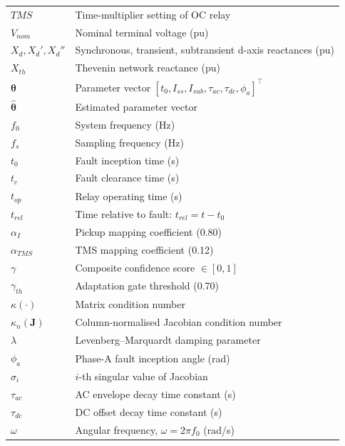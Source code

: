 \documentclass[12pt, a4paper]{article}
\theoremstyle{definition}
\theoremstyle{plain}
\newcommand{\vect}[1]{\bm{#1}}
\newcommand{\mat}[1]{\mathbf{#1}}
\begin{document}
\begin{longtable}{p{3.2cm}p{10cm}}
$TMS$          & Time-multiplier setting of OC relay \\
$V_{nom}$      & Nominal terminal voltage (pu) \\
$X_d, X_d', X_d''$ & Synchronous, transient, subtransient d-axis reactances (pu) \\
$X_{th}$       & Thevenin network reactance (pu) \\
$\vect{\theta}$ & Parameter vector $[t_0, I_{ss}, I_{sub}, \tau_{ac}, \tau_{dc}, \phi_a]^\top$ \\
$\hat{\vect{\theta}}$ & Estimated parameter vector \\
$f_0$          & System frequency (Hz) \\
$f_s$          & Sampling frequency (Hz) \\
$t_0$          & Fault inception time (s) \\
$t_c$          & Fault clearance time (s) \\
$t_{op}$       & Relay operating time (s) \\
$t_{rel}$      & Time relative to fault: $t_{rel} = t - t_0$ \\
$\alpha_I$     & Pickup mapping coefficient (0.80) \\
$\alpha_{TMS}$ & TMS mapping coefficient (0.12) \\
$\gamma$       & Composite confidence score $\in [0, 1]$ \\
$\gamma_{th}$  & Adaptation gate threshold (0.70) \\
$\kappa(\cdot)$ & Matrix condition number \\
$\kappa_n(\mat{J})$ & Column-normalised Jacobian condition number \\
$\lambda$      & Levenberg--Marquardt damping parameter \\
$\phi_a$       & Phase-A fault inception angle (rad) \\
$\sigma_i$     & $i$-th singular value of Jacobian \\
$\tau_{ac}$    & AC envelope decay time constant (s) \\
$\tau_{dc}$    & DC offset decay time constant (s) \\
$\omega$       & Angular frequency, $\omega = 2\pi f_0$ (rad/s) \\
\end{longtable}

\appendix
\end{document}
